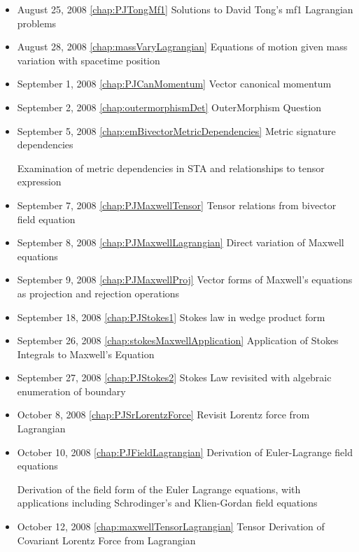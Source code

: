 \begin{itemize}
\item August 25, 2008 \ref{chap:PJTongMf1} Solutions to David Tong's mf1 Lagrangian problems

\item August 28, 2008 \ref{chap:massVaryLagrangian} Equations of motion given mass variation with spacetime position

\item September 1, 2008 \ref{chap:PJCanMomentum} Vector canonical momentum

\item September 2, 2008 \ref{chap:outermorphismDet} OuterMorphism Question 

\item September 5, 2008 \ref{chap:emBivectorMetricDependencies} Metric signature dependencies

Examination of metric dependencies in STA and relationships to tensor expression\item September 7, 2008 \ref{chap:PJMaxwellTensor} Tensor relations from bivector field equation

\item September 8, 2008 \ref{chap:PJMaxwellLagrangian} Direct variation of Maxwell equations

\item September 9, 2008 \ref{chap:PJMaxwellProj} Vector forms of Maxwell's equations as projection and rejection operations

\item September 18, 2008 \ref{chap:PJStokes1} Stokes law in wedge product form

\item September 26, 2008 \ref{chap:stokesMaxwellApplication} Application of Stokes Integrals to Maxwell's Equation

\item September 27, 2008 \ref{chap:PJStokes2} Stokes Law revisited with algebraic enumeration of boundary

\item October 8, 2008 \ref{chap:PJSrLorentzForce} Revisit Lorentz force from Lagrangian

\item October 10, 2008 \ref{chap:PJFieldLagrangian} Derivation of Euler-Lagrange field equations

Derivation of the field form of the Euler Lagrange equations, with applications including Schrodinger's and Klien-Gordan field equations\item October 12, 2008 \ref{chap:maxwellTensorLagrangian} Tensor Derivation of Covariant Lorentz Force from Lagrangian


\end{itemize}
